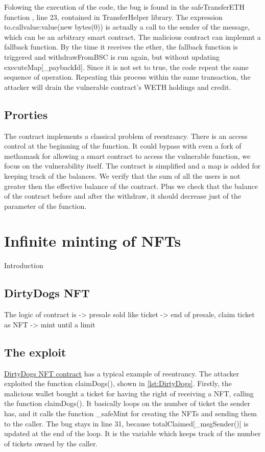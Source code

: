 Folowing the execution of the code, the bug is found in the safeTransferETH function , line 23, contained in TransferHelper library. 
The expression to.call{value:value}(new bytes(0)) is actually a call to the sender of the message, which can be an arbitrary smart contract. 
The malicious contract can implemnt a fallback function. By the time it receives the ether, the fallback function is 
triggered and withdrawFromBSC is run again, but without updating executeMap[\_paybackId]. 
Since it is not set to true, the code repeat the same sequence of operation. 
Repeating this process within the same transaction, the attacker will drain the vulnerable contract's WETH holdings and credit.

\subsection{Prorties}
The contract implements a classical problem of reentrancy. 
There is an access control at the beginning of the function. It could bypass with even a fork of methamask for allowing a smart contract to 
access the vulnerable function, we focus on the vulnerability itself. The contract is simplified and a map is added for keeping track of the balances. 
We verify that the sum of all the users is not greater then the effective balance of the contract. 
Plus we check that the balance of the contract before and after the withdraw, it should decrease just of the parameter of the function. 

\section{Infinite minting of NFTs}   
\label{sec:Exploits:DirtyDogs}
Introduction
\subsection{DirtyDogs NFT}
The logic of contract is 
-> presale sold like ticket
-> end of presale, claim ticket as NFT
-> mint until a limit 

\subsection{The exploit}
\label{sec:DirtyDogs:Exploit}
\href{https://etherscan.io/address/0x540cc373acfacd250a4250d7b26e9800b71f0484#code}{DirtyDogs NFT contract} has a typical example of reentrancy.
The attacker exploited the function claimDogs(), shown in \autoref{lst:DirtyDogs}.
Firstly, the malicious wallet bought a ticket for having the right of receiving a NFT, calling the function claimDogs().
It basically loops on the number of ticket the sender has, and it calls the function \_safeMint for creating the NFTs and sending them to 
the caller.
The bug stays in line 31, because totalClaimed[\_msgSender()] is updated at the end of the loop. It is the variable which 
keeps track of the number of tickets owned by the caller.

